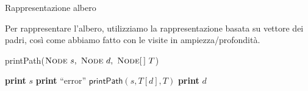 \begin{frame}{Rappresentazione albero}

Per rappresentare l'albero, utilizziamo la rappresentazione basata su vettore dei padri,
così come abbiamo fatto con le visite in ampiezza/profondità.

\bigskip
\begin{Procedure}
\caption[A]{\textsf{printPath}($\Node\ s,\ \Node\ d,\ \Node[\,]\ T$)}

{
  \textbf{print} $s$
}
\uElseIf{$\parent[d] \Eq \Nil$}
{
  \textbf{print} “error”\;
}
\Else
{
  $\textsf{printPath}(s, T[d], T)$\;
  \textbf{print} $d$
}
\end{Procedure}

\end{frame}




